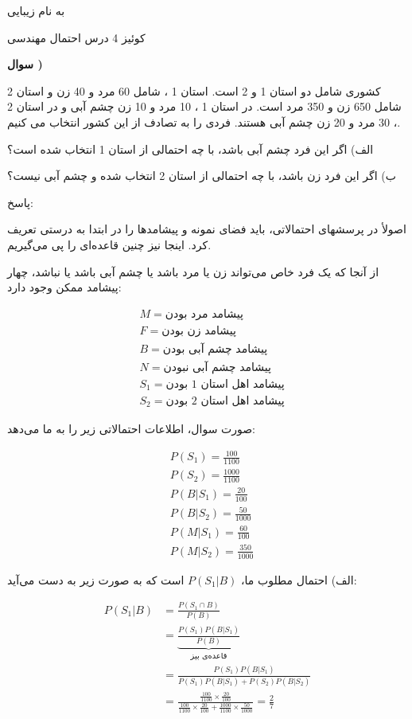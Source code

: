 \documentclass{article}
\newcounter{questionnumber}
\newcommand{\Q}{
\textbf{سوال \thequestionnumber)}
\stepcounter{questionnumber}
}
\newcommand{\eqn}[1]{
\[\begin{split}
#1
\end{split}\]
}
\begin{document}
\LARGE
\begin{center}

به نام زیبایی


کوئیز 4 درس احتمال مهندسی

\end{center}
\hrulefill
\large

\Q

کشوری شامل دو استان 1 و 2 است. استان 1 ، شامل 60 مرد و 40 زن و استان 2 شامل 650 زن و 350 مرد است. در استان 1 ، 10 مرد و 10 زن چشم آبی و در استان 2 ، 30 مرد و 20 زن چشم آبی هستند. فردی را به تصادف از این کشور انتخاب می کنیم.

الف) اگر این فرد چشم آبی باشد، با چه احتمالی از استان 1 انتخاب شده است؟

ب) اگر این فرد زن باشد، با چه احتمالی از استان 2 انتخاب شده و چشم آبی نیست؟

پاسخ:

اصولأ در پرسشهای احتمالاتی، باید فضای نمونه و پیشامدها را در ابتدا به درستی تعریف کرد.  اینجا نیز چنین قاعده‌ای را پی می‌گیریم.

از آنجا که یک فرد خاص می‌تواند زن یا مرد باشد یا چشم آبی باشد یا نباشد، چهار پیشامد ممکن وجود دارد:

\eqn{
&
M=\text{
پیشامد مرد بودن
}
\\&
F=\text{
پیشامد زن بودن
}
\\&
B=\text{
پیشامد چشم آبی بودن
}
\\&
N=\text{
پیشامد چشم آبی نبودن
}
\\&
S_1=\text{
پیشامد اهل استان 1 بودن
}
\\&
S_2=\text{
پیشامد اهل استان 2 بودن
}
}

صورت سوال، اطلاعات احتمالاتی زیر را به ما می‌دهد:
\eqn{
&
P(S_1)=\frac{100}{1100}
\\&
P(S_2)=\frac{1000}{1100}
\\&
P(B|S_1)=\frac{20}{100}
\\&
P(B|S_2)=\frac{50}{1000}
\\&
P(M|S_1)=\frac{60}{100}
\\&
P(M|S_2)=\frac{350}{1000}
}

الف) احتمال مطلوب ما،
$
P(S_1|B)
$
است که به صورت زیر به دست می‌آید:
\eqn{
P(S_1|B)&=
\frac{P(S_1\cap B)}{P(B)}
\\&=
\underbrace{\frac{P(S_1)P(B|S_1)}{P(B)}}_{\text{قاعده‌ی بیز}}
\\&=
\frac{P(S_1)P(B|S_1)}{P(S_1)P(B|S_1)+P(S_2)P(B|S_2)}
\\&=
\frac{
\frac{100}{1100}\times \frac{20}{100}
}{
\frac{100}{1100}\times \frac{20}{100}+\frac{1000}{1100}\times \frac{50}{1000}
}
=\frac{2}{7}
}
\end{document}
